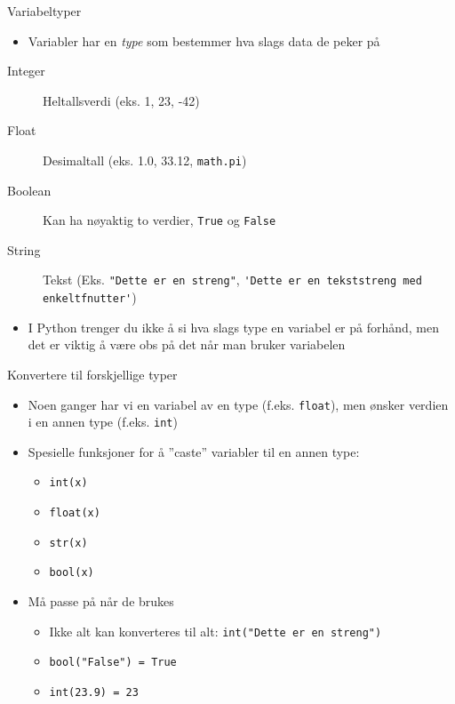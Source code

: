 \documentclass[screen, aspectratio=169]{beamer}
\begin{document}
\begin{frame}[fragile]{Variabeltyper}
	\begin{itemize}
		\item Variabler har en \emph{type} som bestemmer hva slags data de peker på
	\end{itemize}
	\begin{description}
		\item[Integer] Heltallsverdi (eks. 1, 23, -42)
		\item[Float] Desimaltall (eks. 1.0, 33.12, \lstinline|math.pi|)
		\item[Boolean] Kan ha nøyaktig to verdier, \lstinline|True| og \lstinline|False|
		\item[String] Tekst (Eks. \lstinline|"Dette er en streng"|, \lstinline|'Dette er en tekststreng med enkeltfnutter'|)
	\end{description}
	\begin{itemize}
		\item I Python trenger du ikke å si hva slags type en variabel er på forhånd, men det er viktig å være obs på det når man bruker variabelen
	\end{itemize}
\end{frame}


\begin{frame}[fragile]{Konvertere til forskjellige typer}
	\begin{itemize}
		\item Noen ganger har vi en variabel av en type (f.eks. \lstinline|float|), men ønsker verdien i en annen type (f.eks. \lstinline|int|)
		\item Spesielle funksjoner for å ''caste'' variabler til en annen type:
		\begin{itemize}
			\item \lstinline|int(x)|
			\item \lstinline|float(x)|
			\item \lstinline|str(x)|
			\item \lstinline|bool(x)|
		\end{itemize}
		\item Må passe på når de brukes
		\begin{itemize}
			\item Ikke alt kan konverteres til alt: \lstinline|int("Dette er en streng")|
			\item \lstinline|bool("False") = True|
			\item \lstinline|int(23.9) = 23|
		\end{itemize}
	\end{itemize}
\end{frame}
\end{document}

